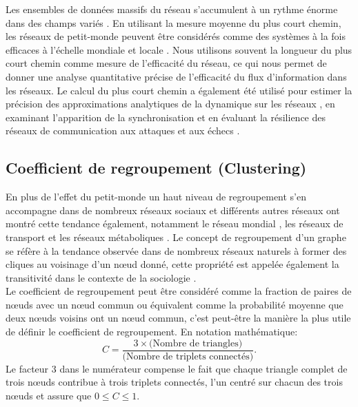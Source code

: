    Les ensembles de données massifs du réseau s'accumulent à un rythme énorme dans des champs variés \cite{Qi-al2010}. En utilisant la mesure moyenne du plus court chemin, les réseaux de petit-monde peuvent être considérés comme des systèmes à la fois efficaces à l'échelle mondiale et locale \cite{Latora-Marchiori2001}. Nous utilisons souvent la longueur du plus court chemin comme mesure de l'efficacité du réseau, ce qui nous permet de donner une analyse quantitative précise de l'efficacité du flux d'information dans les réseaux. Le calcul du plus court chemin a également été utilisé pour estimer la précision des approximations analytiques de la dynamique sur les réseaux \cite{Melnik-al2011}, en examinant l'apparition de la synchronisation \cite{Zhao-al2006} et en évaluant la résilience des réseaux de communication aux attaques et aux échecs \cite{Albert-al2000}.
   
   \subsection{Coefficient de regroupement (Clustering)}
   En plus de l'effet du petit-monde un haut niveau de regroupement s'en accompagne dans de nombreux
   réseaux sociaux et différents autres réseaux ont montré cette tendance également, notamment le réseau mondial \cite{Lad1999}, les réseaux de transport \cite{Seb-al2022} et les réseaux métaboliques \cite{WD2000,SC2001}.
   Le concept de regroupement d'un graphe
   se réfère à la tendance observée dans de nombreux réseaux naturels à former des cliques au voisinage d'un nœud donné, 
   cette propriété est appelée également la transitivité dans le contexte de la sociologie \cite{Wa1994}.\\
   Le coefficient de regroupement peut être considéré comme la fraction de paires de nœuds avec un nœud commun
   ou équivalent comme la probabilité moyenne que deux nœuds voisins ont un nœud commun, c'est peut-\^{e}tre la manière
   la plus utile de définir le coefficient de regroupement. En notation mathématique:
    \begin{equation}
    C=\frac{3\times\text{(Nombre de triangles)}}{\text{(Nombre de triplets connectés)}}
    \label{Clustering}.
   \end{equation}
   Le facteur $3$ dans le numérateur compense le fait que chaque triangle complet de trois nœuds contribue à trois triplets
   connectés, l'un centré sur chacun des trois nœuds et assure que $0\leq C\leq 1$.
 
